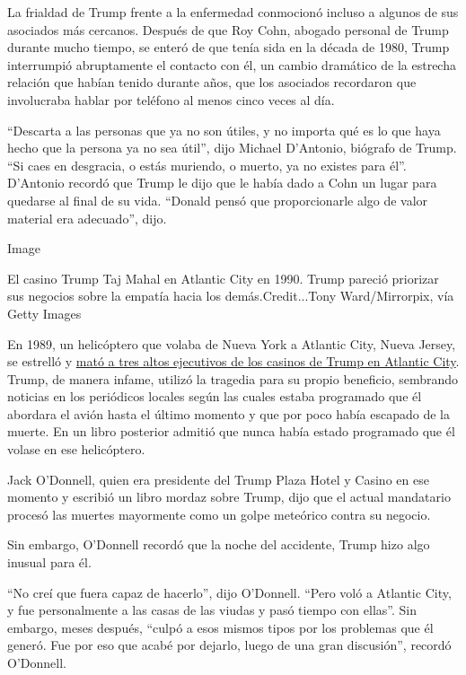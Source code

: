 La frialdad de Trump frente a la enfermedad conmocionó incluso a algunos
de sus asociados más cercanos. Después de que Roy Cohn, abogado personal
de Trump durante mucho tiempo, se enteró de que tenía sida en la década
de 1980, Trump interrumpió abruptamente el contacto con él, un cambio
dramático de la estrecha relación que habían tenido durante años, que
los asociados recordaron que involucraba hablar por teléfono al menos
cinco veces al día.

``Descarta a las personas que ya no son útiles, y no importa qué es lo
que haya hecho que la persona ya no sea útil'', dijo Michael D'Antonio,
biógrafo de Trump. ``Si caes en desgracia, o estás muriendo, o muerto,
ya no existes para él''. D'Antonio recordó que Trump le dijo que le
había dado a Cohn un lugar para quedarse al final de su vida. ``Donald
pensó que proporcionarle algo de valor material era adecuado'', dijo.

Image

El casino Trump Taj Mahal en Atlantic City en 1990. Trump pareció
priorizar sus negocios sobre la empatía hacia los demás.Credit...Tony
Ward/Mirrorpix, vía Getty Images

En 1989, un helicóptero que volaba de Nueva York a Atlantic City, Nueva
Jersey, se estrelló y
\href{https://www.nytimes.com/1989/10/11/nyregion/copter-crash-kills-3-aides-of-trump.html}{mató
a tres altos ejecutivos de los casinos de Trump en Atlantic City}.
Trump, de manera infame, utilizó la tragedia para su propio beneficio,
sembrando noticias en los periódicos locales según las cuales estaba
programado que él abordara el avión hasta el último momento y que por
poco había escapado de la muerte. En un libro posterior admitió que
nunca había estado programado que él volase en ese helicóptero.

Jack O'Donnell, quien era presidente del Trump Plaza Hotel y Casino en
ese momento y escribió un libro mordaz sobre Trump, dijo que el actual
mandatario procesó las muertes mayormente como un golpe meteórico contra
su negocio.

Sin embargo, O'Donnell recordó que la noche del accidente, Trump hizo
algo inusual para él.

``No creí que fuera capaz de hacerlo'', dijo O'Donnell. ``Pero voló a
Atlantic City, y fue personalmente a las casas de las viudas y pasó
tiempo con ellas''. Sin embargo, meses después, ``culpó a esos mismos
tipos por los problemas que él generó. Fue por eso que acabé por
dejarlo, luego de una gran discusión'', recordó O'Donnell.


